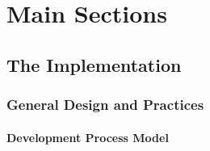 \chapter{Main Sections}

\section{The Implementation}
\subsection{General Design and Practices}

\subsubsection*{Development Process Model}

\begin{comment}
An extreme programming (XP) style approach to development is adopted for this project. 
Extreme programming is a branch of project management derived from the school of agile process models. 
It is almost ideal for this project due to the small scale, very small development team
(in-fact the team only has one member!), and the flexibility to changing requirements as
the project transpires.

Certain features of the XP approach are not applicable for this project. For example there is no opportunity for 
\end{comment}



